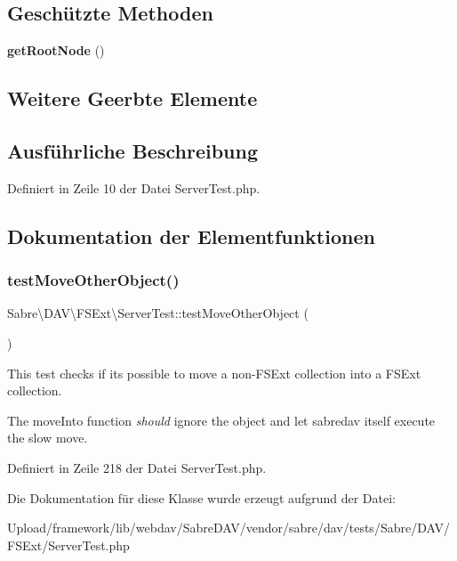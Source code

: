 \subsection*{Geschützte Methoden}
\begin{DoxyCompactItemize}
\item 
\mbox{\label{class_sabre_1_1_d_a_v_1_1_f_s_ext_1_1_server_test_abeb5e25b3076fe8c7010064024239fb5}} 
{\bfseries get\+Root\+Node} ()
\end{DoxyCompactItemize}
\subsection*{Weitere Geerbte Elemente}


\subsection{Ausführliche Beschreibung}


Definiert in Zeile 10 der Datei Server\+Test.\+php.



\subsection{Dokumentation der Elementfunktionen}
\mbox{\label{class_sabre_1_1_d_a_v_1_1_f_s_ext_1_1_server_test_a68505de8913ced069cc2bf0e78d0f8c3}} 
\subsubsection{\texorpdfstring{test\+Move\+Other\+Object()}{testMoveOtherObject()}}
{\footnotesize\ttfamily Sabre\textbackslash{}\+D\+A\+V\textbackslash{}\+F\+S\+Ext\textbackslash{}\+Server\+Test\+::test\+Move\+Other\+Object (\begin{DoxyParamCaption}{ }\end{DoxyParamCaption})}

This test checks if it\textquotesingle{}s possible to move a non-\/\+F\+S\+Ext collection into a F\+S\+Ext collection.

The move\+Into function {\itshape should} ignore the object and let sabredav itself execute the slow move. 

Definiert in Zeile 218 der Datei Server\+Test.\+php.



Die Dokumentation für diese Klasse wurde erzeugt aufgrund der Datei\+:\begin{DoxyCompactItemize}
\item 
Upload/framework/lib/webdav/\+Sabre\+D\+A\+V/vendor/sabre/dav/tests/\+Sabre/\+D\+A\+V/\+F\+S\+Ext/Server\+Test.\+php\end{DoxyCompactItemize}
